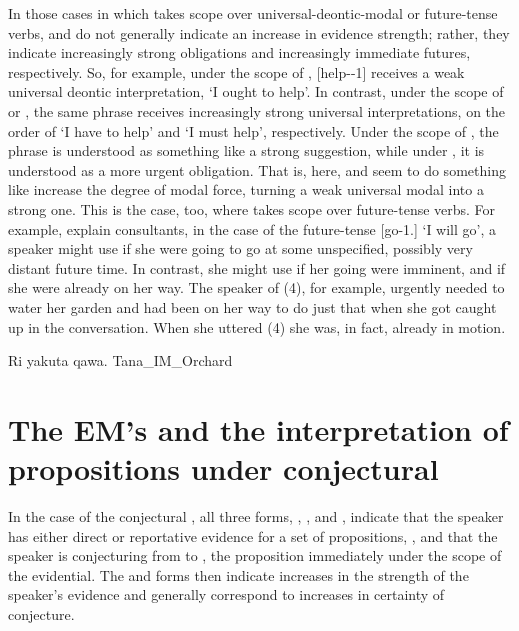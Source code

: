 In those cases in which  takes scope over universal-deontic-modal or future-tense verbs,  and  do not generally indicate an increase in evidence strength; rather, they indicate increasingly strong obligations and increasingly immediate futures, respectively. So, for example, under the scope of ,  [help--1] receives a weak universal deontic interpretation, `I ought to help'. In contrast, under the scope of  or , the same phrase receives increasingly strong universal interpretations, on the order of `I have to help' and `I must help', respectively. Under the scope of , the phrase is understood as something like a strong suggestion, while under , it is understood as a more urgent obligation. That is, here,  and  seem to do something like increase the degree of modal force, turning a weak universal modal into a strong one. This is the case, too, where  takes scope over future-tense verbs. For example, explain consultants, in the case of the future-tense  [go-1.] `I will go', a speaker might use if she were going to go at some unspecified, possibly very distant future time. In contrast, she might use  if her going were imminent, and  if she were already on her way. The speaker of (4), for example, urgently needed to water her garden and had been on her way to do just that when she got caught up in the conversation. When she uttered (4) she was, in fact, already in motion.

%
{Ri yakuta qawa.}%
{}%
{Tana\_IM\_Orchard}{}%

\section{The EM's and the interpretation of propositions under conjectural }
In the case of the conjectural , all three forms, , , and , indicate that the speaker has either direct or reportative evidence for a set of propositions, , and that the speaker is conjecturing from  to , the proposition immediately under the scope of the evidential. The  and  forms then indicate increases in the strength of the speaker's evidence and generally correspond to increases in certainty of conjecture.

